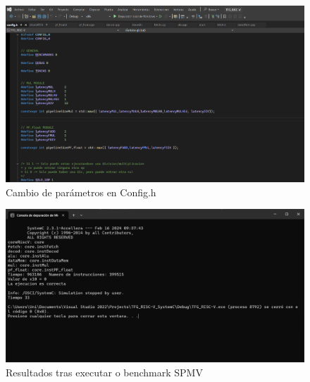 \begin{figure}[hp!]
  \centering
  \includegraphics[width=\textwidth]{imaxes/Cap_5_Config.png}
  \caption{Cambio de parámetros en Config.h}
  \label{fig:parametros}
\end{figure}

\begin{figure}[hp!]
  \centering
  \includegraphics[width=\textwidth]{imaxes/Cap_res_final.png}
  \caption{Resultados tras executar o benchmark SPMV}
  \label{fig:resultados}
\end{figure}


